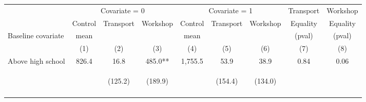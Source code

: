 \begin{tabular}{lcccccccc}
\hline \noalign{\smallskip} & \multicolumn{3}{c}{Covariate = 0} & \multicolumn{3}{c}{Covariate = 1} & Transport & Workshop\\
\cmidrule(lr){2-4}\cmidrule(lr){5-7}\cmidrule(lr){8-9} & Control & {Transport} & {Workshop} & Control & {Transport} & {Workshop} & {Equality} & {Equality}\\
Baseline covariate & mean &  &  & mean &  &  & (pval) & (pval)\\
 & (1) & (2) & (3) & (4) & (5) & (6) & (7) & (8)\\
\noalign{\smallskip}\hline \noalign{\smallskip}Above high school & 826.4 & 16.8 & 485.0** & 1,755.5 & 53.9 & 38.9 & 0.84 & 0.06\\
 & \begin{footnotesize}\end{footnotesize} & \begin{footnotesize}(125.2)\end{footnotesize} & \begin{footnotesize}(189.9)\end{footnotesize} & \begin{footnotesize}\end{footnotesize} & \begin{footnotesize}(154.4)\end{footnotesize} & \begin{footnotesize}(134.0)\end{footnotesize} & \begin{footnotesize}\end{footnotesize} & \begin{footnotesize}\end{footnotesize}\\
 & \begin{footnotesize}\end{footnotesize} & \begin{footnotesize}[1.000]\end{footnotesize} & \begin{footnotesize}[0.031]\end{footnotesize} & \begin{footnotesize}\end{footnotesize} & \begin{footnotesize}[1.000]\end{footnotesize} & \begin{footnotesize}[0.751]\end{footnotesize} & \begin{footnotesize}\end{footnotesize} & \begin{footnotesize}\end{footnotesize}\\

\end{tabular}
